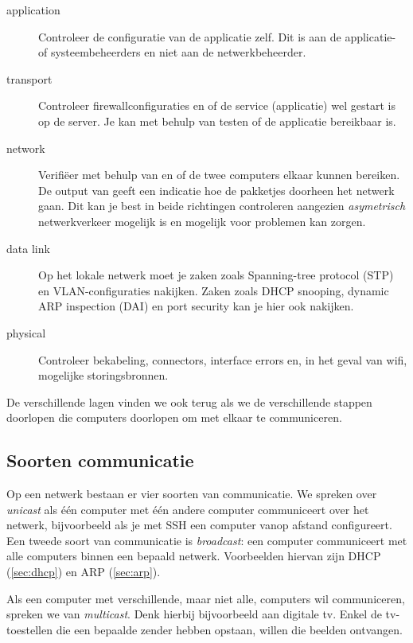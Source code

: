 \begin{description}
\item[application]
   Controleer de configuratie van de applicatie zelf.
   Dit is aan de applicatie- of systeembeheerders en niet aan de netwerkbeheerder.
\item[transport]
   Controleer firewallconfiguraties en of de service (applicatie) wel gestart is op de server.
   Je kan met behulp van  testen of de applicatie bereikbaar is.
\item[network]
   Verifiëer met behulp van  en  of de twee computers elkaar kunnen bereiken.
   De output van  geeft een indicatie hoe de pakketjes doorheen het netwerk gaan.
   Dit kan je best in beide richtingen controleren aangezien \emph{asymetrisch} netwerkverkeer mogelijk is en mogelijk voor problemen kan zorgen.
\item[data link]
   Op het lokale netwerk moet je zaken zoals Spanning-tree protocol (STP) en VLAN-configuraties nakijken.
   Zaken zoals DHCP snooping, dynamic ARP inspection (DAI) en port security kan je hier ook nakijken.
\item[physical]
  Controleer bekabeling, connectors, interface errors en, in het geval van wifi, mogelijke storingsbronnen.
\end{description}

De verschillende lagen vinden we ook terug als we de verschillende stappen doorlopen die computers doorlopen om met elkaar te communiceren.




\subsection{Soorten communicatie}

Op een netwerk bestaan er vier soorten van communicatie.
We spreken over \emph{unicast} als één computer met één andere computer communiceert over het netwerk, bijvoorbeeld als je met SSH een computer vanop afstand configureert.
Een tweede soort van communicatie is \emph{broadcast}: een computer communiceert met alle computers binnen een bepaald netwerk.
Voorbeelden hiervan zijn DHCP (\vref{sec:dhcp}) en ARP (\vref{sec:arp}).

Als een computer met verschillende, maar niet alle, computers wil communiceren, spreken we van \emph{multicast}.
Denk hierbij bijvoorbeeld aan digitale tv.
Enkel de tv-toestellen die een bepaalde zender hebben opstaan, willen die beelden ontvangen.

